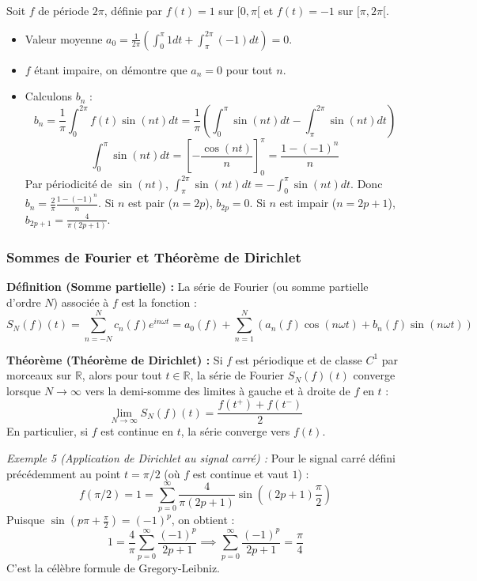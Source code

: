 \documentclass[11pt,a4paper]{article}
\begin{document}
Soit $f$ de période $2\pi$, définie par $f(t) = 1$ sur $[0, \pi[$ et $f(t) = -1$ sur $[\pi, 2\pi[$.
\begin{itemize}
\item Valeur moyenne $a_0 = \frac{1}{2\pi} (\int_0^\pi 1 dt + \int_\pi^{2\pi} (-1) dt) = 0$.
\item $f$ étant impaire, on démontre que $a_n = 0$ pour tout $n$.
\item Calculons $b_n$ :
$$ b_n = \frac{1}{\pi} \int_0^{2\pi} f(t) \sin(nt) dt = \frac{1}{\pi} \left( \int_0^\pi \sin(nt) dt - \int_\pi^{2\pi} \sin(nt) dt \right) $$
$$ \int_0^\pi \sin(nt) dt = \left[ -\frac{\cos(nt)}{n} \right]_0^\pi = \frac{1 - (-1)^n}{n} $$
Par périodicité de $\sin(nt)$, $\int_\pi^{2\pi} \sin(nt) dt = - \int_0^\pi \sin(nt) dt$.
Donc $b_n = \frac{2}{\pi} \frac{1 - (-1)^n}{n}$.
Si $n$ est pair ($n=2p$), $b_{2p} = 0$.
Si $n$ est impair ($n=2p+1$), $b_{2p+1} = \frac{4}{\pi(2p+1)}$.
\end{itemize}

\subsubsection*{Sommes de Fourier et Théorème de Dirichlet}

\textbf{Définition (Somme partielle) :}
La série de Fourier (ou somme partielle d'ordre $N$) associée à $f$ est la fonction :
$$ S_N(f)(t) = \sum_{n=-N}^N c_n(f) e^{in\omega t} = a_0(f) + \sum_{n=1}^N \left( a_n(f) \cos(n\omega t) + b_n(f) \sin(n\omega t) \right) $$

\textbf{Théorème (Théorème de Dirichlet) :}
Si $f$ est périodique et de classe $C^1$ par morceaux sur $\mathbb{R}$, alors pour tout $t \in \mathbb{R}$, la série de Fourier $S_N(f)(t)$ converge lorsque $N \to \infty$ vers la demi-somme des limites à gauche et à droite de $f$ en $t$ :
$$ \lim_{N \to \infty} S_N(f)(t) = \frac{f(t^+) + f(t^-)}{2} $$
En particulier, si $f$ est continue en $t$, la série converge vers $f(t)$.

\textit{Exemple 5 (Application de Dirichlet au signal carré) :}
Pour le signal carré défini précédemment au point $t = \pi/2$ (où $f$ est continue et vaut $1$) :
$$ f(\pi/2) = 1 = \sum_{p=0}^\infty \frac{4}{\pi(2p+1)} \sin\left((2p+1)\frac{\pi}{2}\right) $$
Puisque $\sin\left(p\pi + \frac{\pi}{2}\right) = (-1)^p$, on obtient :
$$ 1 = \frac{4}{\pi} \sum_{p=0}^\infty \frac{(-1)^p}{2p+1} \implies \sum_{p=0}^\infty \frac{(-1)^p}{2p+1} = \frac{\pi}{4} $$
C'est la célèbre formule de Gregory-Leibniz.
\end{document}
